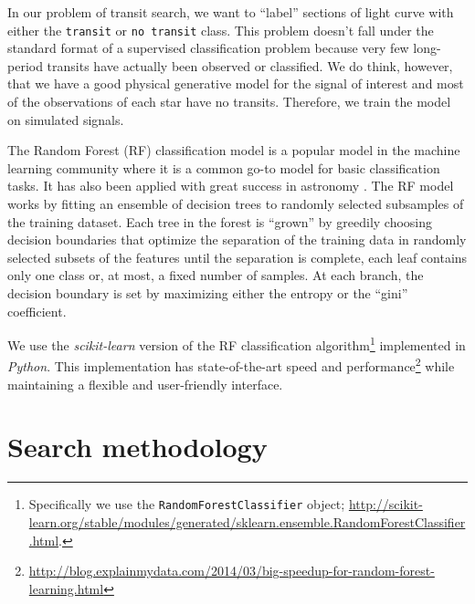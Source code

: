 \documentclass[12pt,preprint]{aastex}
\newcommand{\project}[1]{\textsl{#1}}
\newcommand{\sectlabel}[1]{\label{sect:#1}}
\begin{document}
In our problem of transit search, we want to ``label'' sections of light curve
with either the \texttt{transit} or \texttt{no transit} class.
This problem doesn't fall under the standard format of a supervised
classification problem because very few long-period transits have actually
been observed or classified.
We do think, however, that we have a good physical generative model for the
signal of interest and most of the observations of each star have no transits.
Therefore, we train the model on simulated signals.

The Random Forest (RF) classification model \citep{Breiman:2001} is a popular
model in the machine learning community where it is a common go-to model for
basic classification tasks.
It has also been applied with great success in astronomy \citep[for
example][]{Richards:2011, Richards:2012, Jenkins:2014}.
The RF model works by fitting an ensemble of decision trees to randomly
selected subsamples of the training dataset.
Each tree in the forest is ``grown'' by greedily choosing decision boundaries
that optimize the separation of the training data in randomly selected
subsets of the features until the separation is complete, each leaf contains
only one class or, at most, a fixed number of samples.
At each branch, the decision boundary is set by maximizing either the entropy
or the ``gini'' coefficient.

We use the \project{scikit-learn} \citep{Pedregosa:2011} version of the RF
classification algorithm\footnote{Specifically we use the
\texttt{RandomForestClassifier} object;
\url{http://scikit-learn.org/stable/modules/generated/sklearn.ensemble.RandomForestClassifier.html}.}
implemented in \project{Python}.
This implementation has state-of-the-art speed and
performance\footnote{\url{http://blog.explainmydata.com/2014/03/big-speedup-for-random-forest-learning.html}}
while maintaining a flexible and user-friendly interface.


\section{Search methodology}\sectlabel{search}
\end{document}
